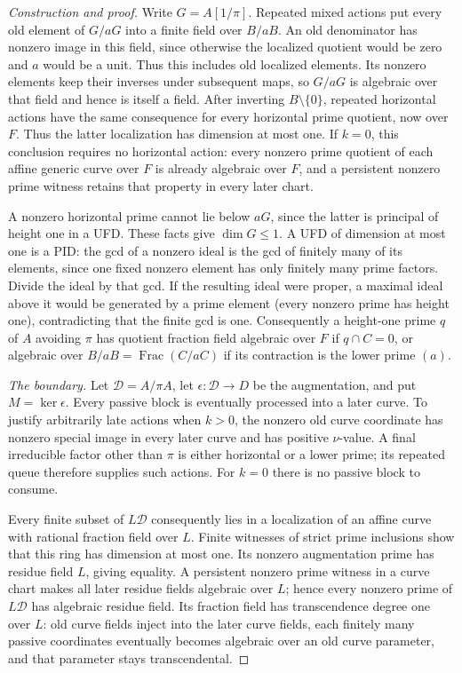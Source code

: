 \documentclass[10pt,a4paper]{amsart}
\begin{document}
\begin{proof}[Construction and proof]
Write \(G=A[1/\pi]\).  Repeated mixed actions put every old
element of \(G/aG\) into a finite field over \(B/aB\).
An old denominator has nonzero image in this field, since otherwise
the localized quotient would be zero and \(a\) would be a unit.
Thus this includes old localized elements.
Its nonzero elements keep their inverses under subsequent maps,
so \(G/aG\) is algebraic over that field and hence is itself
a field.  After inverting \(B\setminus\{0\}\), repeated
horizontal actions have the same consequence for every
horizontal prime quotient, now over \(F\).  Thus the latter
localization has dimension at most one.  If \(k=0\), this
conclusion requires no horizontal action: every nonzero prime
quotient of each affine generic curve over \(F\) is already
algebraic over \(F\), and a persistent nonzero prime witness
retains that property in every later chart.

A nonzero horizontal prime cannot lie below \(aG\), since
the latter is principal of height one in a UFD.  These facts
give \(\dim G\le1\).  A UFD of dimension at most one is a
PID: the gcd of a nonzero ideal is the gcd of finitely many
of its elements, since one fixed nonzero element has only
finitely many prime factors.  Divide the ideal by that gcd.
If the resulting ideal were proper, a maximal ideal above it
would be generated by a prime element (every nonzero prime
has height one), contradicting that the finite gcd is one.
Consequently a height-one prime \(q\) of \(A\) avoiding \(\pi\)
has quotient fraction field algebraic over \(F\) if \(q\cap C=0\),
or algebraic over \(B/aB=\operatorname{Frac}(C/aC)\) if its
contraction is the lower prime \((a)\).

\smallskip\noindent\emph{The boundary.}
Let \(\mathcal D=A/\pi A\), let
\(\epsilon:\mathcal D\to D\) be the augmentation, and put
\(M=\ker\epsilon\).  Every passive block is eventually
processed into a later curve.  To justify arbitrarily late
actions when \(k>0\), the nonzero old curve coordinate has
nonzero special image in every later curve and has positive
\(\nu\)-value.  A final irreducible factor other than \(\pi\)
is either horizontal or a lower prime; its repeated queue
therefore supplies such actions.  For \(k=0\) there is no
passive block to consume.

Every finite subset of \(L\mathcal D\) consequently lies in a
localization of an affine curve with rational fraction field
over \(L\).  Finite witnesses of strict prime inclusions show
that this ring has dimension at most one.  Its nonzero
augmentation prime has residue field \(L\), giving equality.
A persistent nonzero prime witness in a curve chart makes all
later residue fields algebraic over \(L\); hence every nonzero
prime of \(L\mathcal D\) has algebraic residue field.  Its
fraction field has transcendence degree one over \(L\): old
curve fields inject into the later curve fields, each finitely
many passive coordinates eventually becomes algebraic over an
old curve parameter, and that parameter stays transcendental.


\end{proof}
\end{document}
